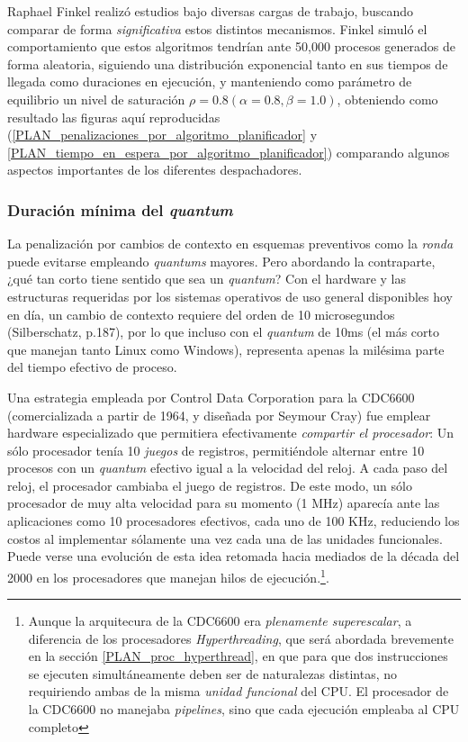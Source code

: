 \documentclass[11pt,fleqn]{book} %
\begin{document}
Raphael Finkel realizó estudios bajo diversas cargas de trabajo,
buscando comparar de forma \emph{significativa} estos distintos
mecanismos. Finkel simuló el comportamiento que estos algoritmos
tendrían ante 50,000 procesos generados de forma aleatoria, siguiendo
una distribución exponencial tanto en sus tiempos de llegada como
duraciones en ejecución, y manteniendo como parámetro de equilibrio un
nivel de saturación $\rho = 0.8 (\alpha = 0.8, \beta = 1.0)$,
obteniendo como resultado las figuras aquí reproducidas
(\ref{PLAN_penalizaciones_por_algoritmo_planificador} y
\ref{PLAN_tiempo_en_espera_por_algoritmo_planificador}) comparando
algunos aspectos importantes de los diferentes despachadores.
\subsubsection{Duración mínima del \emph{quantum}}
\label{sec-4-2-9-2}


La penalización por cambios de contexto en esquemas
preventivos como la \emph{ronda} puede evitarse empleando \emph{quantums}
mayores. Pero abordando la contraparte, ¿qué tan corto tiene sentido que sea un
\emph{quantum}? Con el hardware y las estructuras requeridas por los
sistemas operativos de uso general disponibles hoy en día, un cambio
de contexto requiere del orden de 10 microsegundos (Silberschatz,
p.187), por lo que incluso con el \emph{quantum} de 10ms (el más corto que
manejan tanto Linux como Windows), representa apenas la milésima parte
del tiempo efectivo de proceso.

Una estrategia empleada por Control Data Corporation para la CDC6600
(comercializada a partir de 1964, y diseñada por Seymour Cray) fue
emplear hardware especializado que permitiera efectivamente \emph{compartir el procesador}: Un sólo procesador tenía 10 \emph{juegos} de registros,
permitiéndole alternar entre 10 procesos con un \emph{quantum} efectivo
igual a la velocidad del reloj. A cada paso del reloj, el procesador
cambiaba el juego de registros. De este modo, un sólo procesador de
muy alta velocidad para su momento (1 MHz) aparecía ante las
aplicaciones como 10 procesadores efectivos, cada uno de 100 KHz,
reduciendo los costos al implementar sólamente una vez cada una de las
unidades funcionales. Puede verse una evolución de esta idea retomada
hacia mediados de la década del 2000 en los procesadores que manejan
hilos de ejecución.\footnote{Aunque la arquitecura de la CDC6600 era
\emph{plenamente superescalar}, a diferencia de los procesadores
\emph{Hyperthreading}, que será abordada brevemente en la sección
\ref{PLAN_proc_hyperthread}, en que para que dos instrucciones se
ejecuten simultáneamente deben ser de naturalezas distintas, no
requiriendo ambas de la misma \emph{unidad funcional} del CPU. El
procesador de la CDC6600 no manejaba \emph{pipelines}, sino que cada
ejecución empleaba al CPU completo }.
\end{document}
